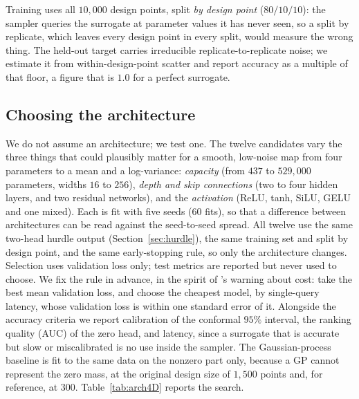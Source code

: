 \documentclass[sn-basic,iicol,pdflatex]{sn-jnl}
\begin{document}
Training uses all $10{,}000$ design points, split \emph{by design point}
($80/10/10$): the sampler queries the surrogate at parameter values it has never
seen, so a split by replicate, which leaves every design point in every split,
would measure the wrong thing. The held-out target carries irreducible
replicate-to-replicate noise; we estimate it from within-design-point scatter
and report accuracy as a multiple of that floor, a figure that is $1.0$ for a
perfect surrogate.

\subsection{Choosing the architecture}
\label{sec:arch4D}

We do not assume an architecture; we test one. The twelve candidates vary the three things that
could plausibly matter for a smooth, low-noise map from four parameters to a mean and a log-variance:
\emph{capacity} (from $437$ to $529{,}000$ parameters, widths $16$ to $256$), \emph{depth and skip
connections} (two to four hidden layers, and two residual networks), and the \emph{activation}
(ReLU, tanh, SiLU, GELU and one mixed). Each is fit with five seeds ($60$ fits), so that a
difference between architectures can be read against the seed-to-seed spread. All twelve use the
same two-head hurdle output (Section~\ref{sec:hurdle}), the same training set and split by design
point, and the same early-stopping rule, so only the architecture changes. Selection uses
validation loss only; test metrics are reported but never used to choose. We
fix the rule in advance, in the spirit of \citeauthor{lu2023}'s warning about cost: take the best mean validation
loss, and choose the cheapest model, by single-query latency, whose validation loss is within one
standard error of it. Alongside the accuracy criteria we report calibration of the conformal $95\%$ interval, the
ranking quality (AUC) of the zero head, and latency, since a surrogate that is accurate but slow or
miscalibrated is no use inside the sampler. The Gaussian-process baseline is fit to the same data on the nonzero part only, because a GP cannot
represent the zero mass, at the original design size of $1{,}500$ points and, for reference, at $300$. Table~\ref{tab:arch4D} reports the search.

\begin{table}[t]
\centering
\caption{Architecture search on held-out design points, five seeds each
(mean $\pm$ s.d.). Accuracy is test MSE as a multiple of the irreducible noise
floor ($1.0$ is perfect); coverage is of the conformal-calibrated $95\%$ interval;
AUC is of the zero head. Latency is a single query; the last column is a batch of
$10^5$. The chosen model is in bold. The GP baseline models $\log_{10}\bar d$ on
nonzero rows only.}
\label{tab:arch4D}
\small

\end{table}
\end{document}
